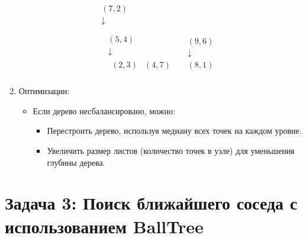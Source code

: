 \begin{enumerate}
            \[
\begin{array}{c}
    (7, 2)\\
    \downarrow\\
    \begin{array}{cc}
        \text{} & \text{} \\
        \begin{array}{c}
            (5, 4) \\
            \downarrow \\
            \begin{array}{cc}
                (2, 3) & (4, 7)
            \end{array}
        \end{array}
        &
        \begin{array}{c}
            (9, 6) \\
            \downarrow \\
            (8, 1)
        \end{array}
    \end{array}
\end{array}
\]
    \item Оптимизации:
    \begin{itemize}
        \item Если дерево несбалансировано, можно:
        \begin{itemize}
            \item Перестроить дерево, используя медиану всех точек на каждом уровне.
            \item Увеличить размер листов (количество точек в узле) для уменьшения глубины дерева.
        \end{itemize}
    \end{itemize}
\end{enumerate}

\section*{Задача 3: Поиск ближайшего соседа с использованием BallTree}


